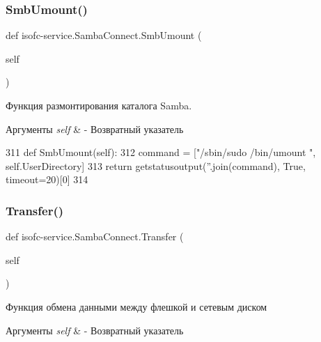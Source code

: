 \subsubsection{\texorpdfstring{Smb\+Umount()}{SmbUmount()}}
{\footnotesize\ttfamily def isofc-\/service.\+Samba\+Connect.\+Smb\+Umount (\begin{DoxyParamCaption}\item[{}]{self }\end{DoxyParamCaption})}



Функция размонтирования каталога Samba. 


\begin{DoxyParams}{Аргументы}
{\em self} & -\/ Возвратный указатель \\
\hline
\end{DoxyParams}

\begin{DoxyCode}
311     \textcolor{keyword}{def }SmbUmount(self):
312         command = [\textcolor{stringliteral}{"/sbin/sudo /bin/umount "}, self.UserDirectory]
313         \textcolor{keywordflow}{return} getstatusoutput(\textcolor{stringliteral}{''}.join(command), \textcolor{keyword}{True}, timeout=20)[0]
314 
\end{DoxyCode}
\mbox{\label{classisofc-service_1_1SambaConnect_aeaa767a173ce5e1f7d92770d53b7878d}} 
\subsubsection{\texorpdfstring{Transfer()}{Transfer()}}
{\footnotesize\ttfamily def isofc-\/service.\+Samba\+Connect.\+Transfer (\begin{DoxyParamCaption}\item[{}]{self }\end{DoxyParamCaption})}



Функция обмена данными между флешкой и сетевым диском 


\begin{DoxyParams}{Аргументы}
{\em self} & -\/ Возвратный указатель \\
\hline
\end{DoxyParams}

